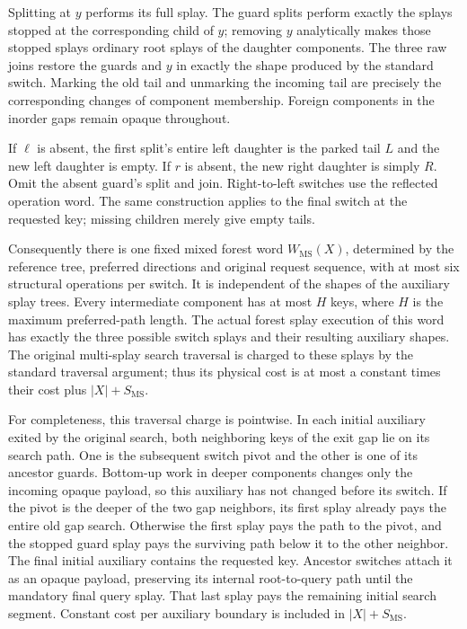 \documentclass[11pt]{article}
\newcommand{\MS}{\mathrm{MS}}
\begin{document}
Splitting at $y$ performs its full splay. The guard splits perform
exactly the splays stopped at the corresponding child of $y$; removing
$y$ analytically makes those stopped splays ordinary root splays of
the daughter components. The three raw joins restore the guards and
$y$ in exactly the shape produced by the standard switch. Marking the
old tail and unmarking the incoming tail are precisely the corresponding
changes of component membership. Foreign components in the inorder
gaps remain opaque throughout.

If $\ell$ is absent, the first split's entire left daughter is the
parked tail $L$ and the new left daughter is empty. If $r$ is absent,
the new right daughter is simply $R$. Omit the absent guard's split and
join. Right-to-left switches use the reflected operation word. The
same construction applies to the final switch at the requested key;
missing children merely give empty tails.

Consequently there is one fixed mixed forest word $W_{\MS}(X)$,
determined by the reference tree, preferred directions and original
request sequence, with at most six structural operations per switch.
It is independent of the shapes of the auxiliary splay trees. Every
intermediate component has at most $H$ keys, where $H$ is the maximum
preferred-path length. The actual forest splay execution of this word
has exactly the three possible switch splays and their resulting
auxiliary shapes. The original multi-splay search traversal is charged
to these splays by the standard traversal argument; thus its physical
cost is at most a constant times their cost plus $|X|+S_{\MS}$.

For completeness, this traversal charge is pointwise. In each initial
auxiliary exited by the original search, both neighboring keys of the
exit gap lie on its search path. One is the subsequent switch pivot
and the other is one of its ancestor guards. Bottom-up work in deeper
components changes only the incoming opaque payload, so this auxiliary
has not changed before its switch. If the pivot is the deeper of the
two gap neighbors, its first splay already pays the entire old gap
search. Otherwise the first splay pays the path to the pivot, and the
stopped guard splay pays the surviving path below it to the other
neighbor. The final initial auxiliary contains the requested key.
Ancestor switches attach it as an opaque payload, preserving its
internal root-to-query path until the mandatory final query splay.
That last splay pays the remaining initial search segment. Constant
cost per auxiliary boundary is included in $|X|+S_{\MS}$.
\end{document}
